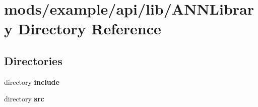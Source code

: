 \section{mods/example/api/lib/\+A\+N\+N\+Library Directory Reference}
\label{dir_8e0c490eaf0a23ec4e41a581020775bc}
\subsection*{Directories}
\begin{DoxyCompactItemize}
\item 
directory {\bf include}
\item 
directory {\bf src}
\end{DoxyCompactItemize}
